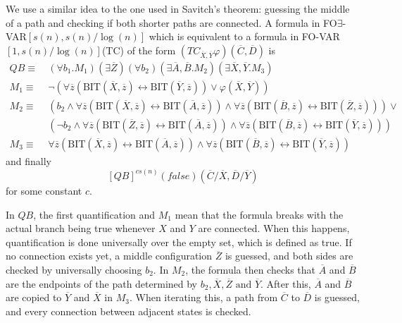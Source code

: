We use a similar idea to the one used in Savitch's theorem: guessing the middle of a path and checking if both shorter paths are connected.
A formula in FO$\exists$-VAR$[s(n), s(n)/\log(n)]$ which is equivalent to a formula in FO-VAR$[1, s(n)/\log(n)]$(TC) of the form $\left( TC_{\overline{X}, \overline{Y}}\varphi \right)(\overline{C}, \overline{D})$ is
\[
    \begin{aligned}
        QB \equiv~& (\forall b_{1}.M_{1})(\exists\overline{Z}) (\forall b_{2})(\exists \overline{A}, \overline{B}.M_{2})(\exists\overline{X}, \overline{Y}.M_{3}) \\
        M_{1} \equiv~& \neg(\forall \overline{z} (\text{BIT}(\overline{X}, \overline{z}) \leftrightarrow \text{BIT}(\overline{Y}, \overline{z})) \lor \varphi(\overline{X}, \overline{Y})) \\
        M_{2} \equiv~&(b_{2} \land \forall \overline{z} (\text{BIT}(\overline{X}, \overline{z}) \leftrightarrow \text{BIT}(\overline{A}, \overline{z}))\land \forall \overline{z} (\text{BIT}(\overline{B}, \overline{z}) \leftrightarrow \text{BIT}(\overline{Z}, \overline{z}))) \lor \\
        &(\neg b_{2} \land \forall \overline{z} (\text{BIT}(\overline{Z}, \overline{z}) \leftrightarrow \text{BIT}(\overline{A}, \overline{z}))\land \forall \overline{z} (\text{BIT}(\overline{B}, \overline{z}) \leftrightarrow \text{BIT}(\overline{Y}, \overline{z}))) \\
        M_{3} \equiv~&\forall \overline{z} (\text{BIT}(\overline{X}, \overline{z}) \leftrightarrow \text{BIT}(\overline{A}, \overline{z}))\land \forall \overline{z} (\text{BIT}(\overline{B}, \overline{z}) \leftrightarrow \text{BIT}(\overline{Y}, \overline{z}))
    \end{aligned}
\]
and finally
\[
    [QB]^{cs(n)}(false)(\overline{C} / \overline{X}, \overline{D} / \overline{Y})
\]
for some constant $c$.

In $QB$, the first quantification and $M_1$ mean that the formula breaks with the actual branch being true whenever $X$ and $Y$ are connected.
When this happens, quantification is done universally over the empty set, which is defined as true.
If no connection exists yet, a middle configuration $\overline{Z}$ is guessed, and both sides are checked by universally choosing $b_2$.
In $M_2$, the formula then checks that $\overline{A}$ and $\overline{B}$ are the endpoints of the path determined by $b_2, \overline{X}, \overline{Z} \text{ and }\overline{Y}$.
After this, $\overline{A}$ and $\overline{B}$ are copied to $\overline{Y}$ and $\overline{X}$ in $M_3$.
When iterating this, a path from $\overline{C}$ to $\overline{D}$ is guessed, and every connection between adjacent states is checked.


